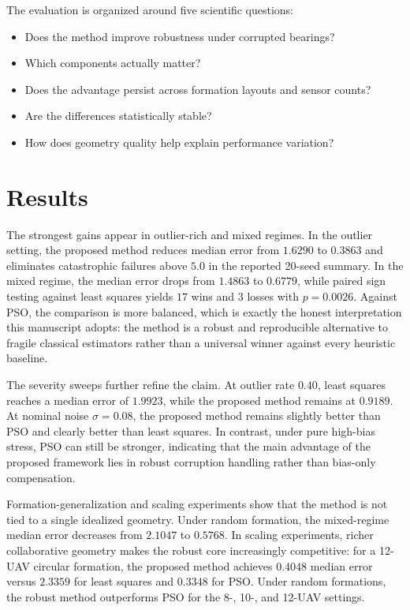 \documentclass[preprint,12pt]{elsarticle}
\begin{document}
The evaluation is organized around five scientific questions:
\begin{itemize}
\item Does the method improve robustness under corrupted bearings?
\item Which components actually matter?
\item Does the advantage persist across formation layouts and sensor counts?
\item Are the differences statistically stable?
\item How does geometry quality help explain performance variation?
\end{itemize}

\section{Results}

The strongest gains appear in outlier-rich and mixed regimes. In the outlier setting, the proposed method reduces median error from $1.6290$ to $0.3863$ and eliminates catastrophic failures above $5.0$ in the reported 20-seed summary. In the mixed regime, the median error drops from $1.4863$ to $0.6779$, while paired sign testing against least squares yields $17$ wins and $3$ losses with $p=0.0026$. Against PSO, the comparison is more balanced, which is exactly the honest interpretation this manuscript adopts: the method is a robust and reproducible alternative to fragile classical estimators rather than a universal winner against every heuristic baseline.

The severity sweeps further refine the claim. At outlier rate $0.40$, least squares reaches a median error of $1.9923$, while the proposed method remains at $0.9189$. At nominal noise $\sigma=0.08$, the proposed method remains slightly better than PSO and clearly better than least squares. In contrast, under pure high-bias stress, PSO can still be stronger, indicating that the main advantage of the proposed framework lies in robust corruption handling rather than bias-only compensation.

Formation-generalization and scaling experiments show that the method is not tied to a single idealized geometry. Under random formation, the mixed-regime median error decreases from $2.1047$ to $0.5768$. In scaling experiments, richer collaborative geometry makes the robust core increasingly competitive: for a 12-UAV circular formation, the proposed method achieves $0.4048$ median error versus $2.3359$ for least squares and $0.3348$ for PSO. Under random formations, the robust method outperforms PSO for the 8-, 10-, and 12-UAV settings.
\end{document}
